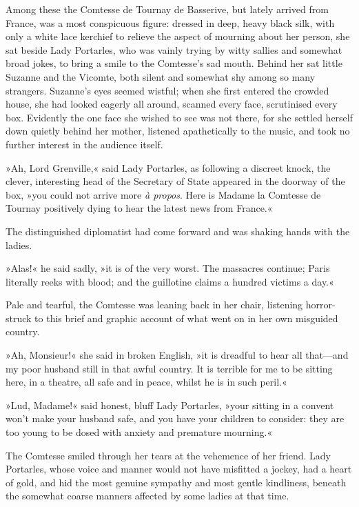 Among these the Comtesse de Tournay de Basserive, but lately arrived from France, was a most conspicuous figure: dressed in deep, heavy black silk, with only a white lace kerchief to relieve the aspect of mourning about her person, she sat beside Lady Portarles, who was vainly trying by witty sallies and somewhat broad jokes, to bring a smile to the Comtesse's sad mouth. Behind her sat little Suzanne and the Vicomte, both silent and somewhat shy among so many strangers. Suzanne's eyes seemed wistful; when she first entered the crowded house, she had looked eagerly all around, scanned every face, scrutinised every box. Evidently the one face she wished to see was not there, for she settled herself down quietly behind her mother, listened apathetically to the music, and took no further interest in the audience itself.

»Ah, Lord Grenville,« said Lady Portarles, as following a discreet knock, the clever, interesting head of the Secretary of State appeared in the doorway of the box, »you could not arrive more \textit{à propos}. Here is Madame la Comtesse de Tournay positively dying to hear the latest news from France.«

The distinguished diplomatist had come forward and was shaking hands with the ladies.

»Alas!« he said sadly, »it is of the very worst. The massacres continue; Paris literally reeks with blood; and the guillotine claims a hundred victims a day.«

Pale and tearful, the Comtesse was leaning back in her chair, listening horror-struck to this brief and graphic account of what went on in her own misguided country.

»Ah, Monsieur!« she said in broken English, »it is dreadful to hear all that—and my poor husband still in that awful country. It is terrible for me to be sitting here, in a theatre, all safe and in peace, whilst he is in such peril.«

»Lud, Madame!« said honest, bluff Lady Portarles, »your sitting in a convent won't make your husband safe, and you have your children to consider: they are too young to be dosed with anxiety and premature mourning.«

The Comtesse smiled through her tears at the vehemence of her friend. Lady Portarles, whose voice and manner would not have misfitted a jockey, had a heart of gold, and hid the most genuine sympathy and most gentle kindliness, beneath the somewhat coarse manners affected by some ladies at that time.

